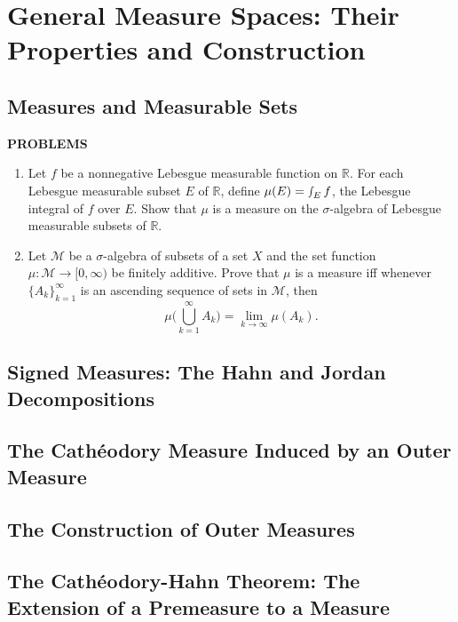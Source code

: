 \chapter{General Measure Spaces: Their Properties and Construction}

\section{Measures and Measurable Sets}

\begin{center}
	\textbf{PROBLEMS}
\end{center}
\begin{enumerate}
	\setcounter{enumi}{0}
	\item Let $f$ be a nonnegative Lebesgue measurable function on $\mathbb{R}$. 
	For each Lebesgue measurable subset $E$ of $\mathbb{R}$, define $\mu(E) = \smallint_E f$, the Lebesgue integral of $f$ over $E$.
	Show that $\mu$ is a measure on the $\sigma$-algebra of Lebesgue measurable subsets of $\mathbb{R}$.
	\item Let $\mathcal{M}$ be a $\sigma$-algebra of subsets of a set $X$ and the set function $\mu : \mathcal{M} \to [0,\infty)$ be finitely additive.
	Prove that $\mu$ is a measure iff whenever $\{A_k\}_{k=1}^\infty$ is an ascending sequence of sets in $\mathcal{M}$, then
	\[
	\mu \biggl ( \bigcup_{k=1}^\infty A_k \biggr ) = \lim_{k \to \infty} \mu(A_k).	
	\]
\end{enumerate}

\section{Signed Measures: The Hahn and Jordan Decompositions}
\section{The Cath\'eodory Measure Induced by an Outer Measure}
\section{The Construction of Outer Measures}
\section{The Cath\'eodory-Hahn Theorem: The Extension of a Premeasure to a Measure}
